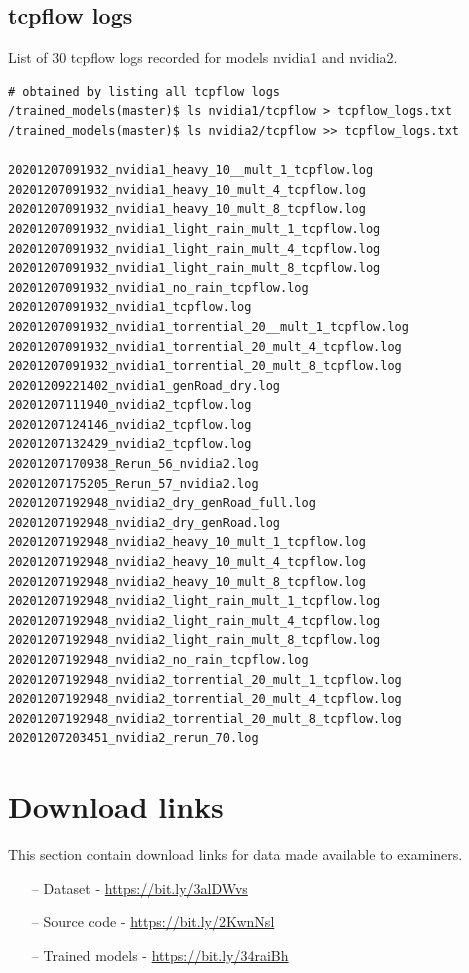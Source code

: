 \subsection{tcpflow logs}
List of 30 tcpflow logs recorded for models nvidia1 and nvidia2.
\begin{verbatim}
# obtained by listing all tcpflow logs
/trained_models(master)$ ls nvidia1/tcpflow > tcpflow_logs.txt
/trained_models(master)$ ls nvidia2/tcpflow >> tcpflow_logs.txt

20201207091932_nvidia1_heavy_10__mult_1_tcpflow.log
20201207091932_nvidia1_heavy_10_mult_4_tcpflow.log
20201207091932_nvidia1_heavy_10_mult_8_tcpflow.log
20201207091932_nvidia1_light_rain_mult_1_tcpflow.log
20201207091932_nvidia1_light_rain_mult_4_tcpflow.log
20201207091932_nvidia1_light_rain_mult_8_tcpflow.log
20201207091932_nvidia1_no_rain_tcpflow.log
20201207091932_nvidia1_tcpflow.log
20201207091932_nvidia1_torrential_20__mult_1_tcpflow.log
20201207091932_nvidia1_torrential_20_mult_4_tcpflow.log
20201207091932_nvidia1_torrential_20_mult_8_tcpflow.log
20201209221402_nvidia1_genRoad_dry.log
20201207111940_nvidia2_tcpflow.log
20201207124146_nvidia2_tcpflow.log
20201207132429_nvidia2_tcpflow.log
20201207170938_Rerun_56_nvidia2.log
20201207175205_Rerun_57_nvidia2.log
20201207192948_nvidia2_dry_genRoad_full.log
20201207192948_nvidia2_dry_genRoad.log
20201207192948_nvidia2_heavy_10_mult_1_tcpflow.log
20201207192948_nvidia2_heavy_10_mult_4_tcpflow.log
20201207192948_nvidia2_heavy_10_mult_8_tcpflow.log
20201207192948_nvidia2_light_rain_mult_1_tcpflow.log
20201207192948_nvidia2_light_rain_mult_4_tcpflow.log
20201207192948_nvidia2_light_rain_mult_8_tcpflow.log
20201207192948_nvidia2_no_rain_tcpflow.log
20201207192948_nvidia2_torrential_20_mult_1_tcpflow.log
20201207192948_nvidia2_torrential_20_mult_4_tcpflow.log
20201207192948_nvidia2_torrential_20_mult_8_tcpflow.log
20201207203451_nvidia2_rerun_70.log

\end{verbatim}

\section{Download links}
\label{res:download-links}
This section contain download links for data made available to examiners.
\begin{itemize}
    \item [--] Dataset - \url{https://bit.ly/3alDWvs}
    \item [--] Source code - \url{https://bit.ly/2KwnNsl}
    \item [--] Trained models - \url{https://bit.ly/34raiBh}
\end{itemize}
